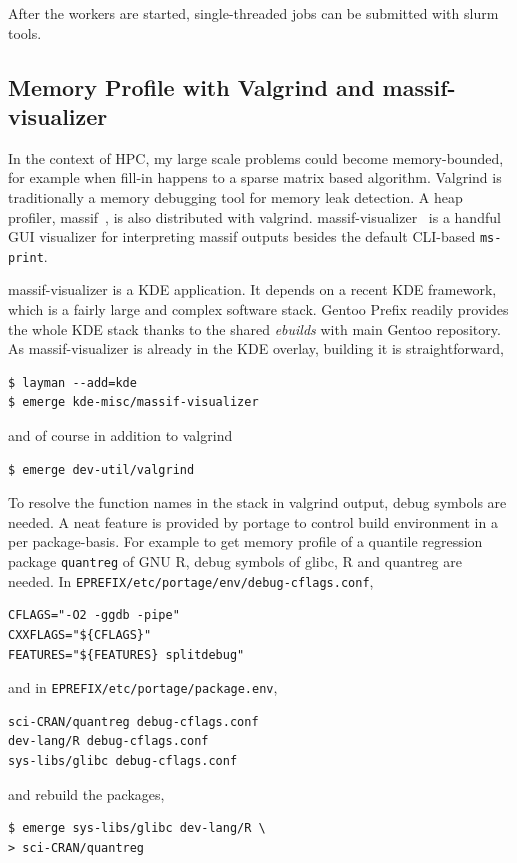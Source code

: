 \documentclass[a4paper,conference]{IEEEtran}
\begin{document}
After the workers are started, single-threaded jobs can be submitted
with slurm tools.

\subsection{Memory Profile with Valgrind and massif-visualizer}
\label{sec:massif}
In the context of HPC, my large scale problems could become
memory-bounded, for example when fill-in happens to a sparse matrix
based algorithm.  Valgrind is traditionally a memory debugging tool
for memory leak detection.  A heap profiler, massif~\cite{massif}, is
also distributed with valgrind.
massif-visualizer~\cite{massif:visualizer} is a handful GUI visualizer
for interpreting massif outputs besides the default CLI-based
\texttt{ms-print}.

massif-visualizer is a KDE application.  It depends on a recent KDE
framework, which is a fairly large and complex software stack.  Gentoo
Prefix readily provides the whole KDE stack thanks to the shared
\textit{ebuilds} with main Gentoo repository.  As massif-visualizer is
already in the KDE overlay, building it is straightforward,
\begin{verbatim}
$ layman --add=kde
$ emerge kde-misc/massif-visualizer
\end{verbatim}
and of course in addition to valgrind
\begin{verbatim}
$ emerge dev-util/valgrind
\end{verbatim}

To resolve the function names in the stack in valgrind output, debug
symbols are needed.  A neat feature is provided by portage to control
build environment in a per package-basis.  For example to get memory
profile of a quantile regression package \texttt{quantreg} of GNU R,
debug symbols of glibc, R and quantreg are needed. In
\texttt{EPREFIX/etc/portage/env/debug-cflags.conf},
\begin{verbatim}
CFLAGS="-O2 -ggdb -pipe"
CXXFLAGS="${CFLAGS}"
FEATURES="${FEATURES} splitdebug"
\end{verbatim}
and in \texttt{EPREFIX/etc/portage/package.env},
\begin{verbatim}
sci-CRAN/quantreg debug-cflags.conf
dev-lang/R debug-cflags.conf
sys-libs/glibc debug-cflags.conf
\end{verbatim}
and rebuild the packages,
\begin{verbatim}
$ emerge sys-libs/glibc dev-lang/R \
> sci-CRAN/quantreg
\end{verbatim}
\end{document}
